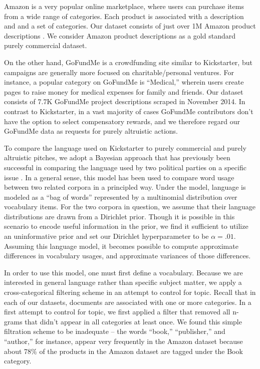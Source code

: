 \documentclass[letterpaper]{article}
\begin{document}
Amazon is a very popular online marketplace, where users can purchase items from a wide range of categories. Each product is associated with a description and and a set of categories. Our dataset consists of just over 1M Amazon product descriptions \cite{mcauley2013hidden}. We consider Amazon product descriptions as a gold standard purely commercial dataset.

On the other hand, GoFundMe is a crowdfunding site similar to Kickstarter, but campaigns are generally more focused on charitable/personal ventures. For instance, a popular category on GoFundMe is ``Medical,'' wherein users create pages to raise money for medical expenses for family and friends. Our dataset consists of 7.7K GoFundMe project descriptions scraped in November 2014. In contrast to Kickstarter, in a vast majority of cases GoFundMe contributors don't have the option to select compensatory rewards, and we therefore regard our GoFundMe data as requests for purely altruistic actions.

To compare the language used on Kickstarter to purely commercial and purely altruistic pitches, we adopt a Bayesian approach that has previously been successful in comparing the language used by two political parties on a specific issue \cite{monroe2008fightin}. In a general sense, this model has been used to compare word usage between two related corpora in a principled way. Under the model, language is modeled as a ``bag of words'' represented by a multinomial distribution over vocabulary items. For the two corpora in question, we assume that their language distributions are drawn from a Dirichlet prior. Though it is possible in this scenario to encode useful information in the prior, we find it sufficient to utilize an uninformative prior and set our Dirichlet hyperparameter to be $\alpha=.01$. Assuming this language model, it becomes possible to compute approximate differences in vocabulary usages, and approximate variances of those differences.

In order to use this model, one must first define a vocabulary. Because we are interested in general language rather than specific subject matter, we apply a cross-categorical filtering scheme in an attempt to control for topic. Recall that in each of our datasets, documents are associated with one or more categories. In a first attempt to control for topic, we first applied a filter that removed all n-grams that didn't appear in all categories at least once. We found this simple filtration scheme to be inadequate -- the words ``book,'' ``publisher,'' and ``author,'' for instance, appear very frequently in the Amazon dataset because about 78\% of the products in the Amazon dataset are tagged under the Book category.
\end{document}
